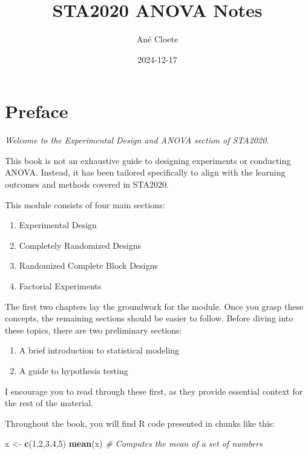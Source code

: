 \documentclass[
  letterpaper,
]{book}
\title{STA2020 ANOVA Notes}
\author{Ané Cloete}
\date{2024-12-17}
\newenvironment{Shaded}{\begin{snugshade}}{\end{snugshade}}
\newcommand{\CommentTok}[1]{\textcolor[rgb]{0.56,0.35,0.01}{\textit{#1}}}
\newcommand{\DecValTok}[1]{\textcolor[rgb]{0.00,0.00,0.81}{#1}}
\newcommand{\FunctionTok}[1]{\textcolor[rgb]{0.13,0.29,0.53}{\textbf{#1}}}
\newcommand{\NormalTok}[1]{#1}
\newcommand{\OtherTok}[1]{\textcolor[rgb]{0.56,0.35,0.01}{#1}}
\providecommand{\tightlist}{%
  \setlength{\itemsep}{0pt}\setlength{\parskip}{0pt}}\usepackage{longtable,booktabs,array}
\renewcommand*\contentsname{Table of contents}
\newcommand\contentsname{Table of contents}
\begin{document}
\frontmatter
\maketitle

\renewcommand*\contentsname{Table of contents}
{
\setcounter{tocdepth}{2}
\tableofcontents
}

\mainmatter
{}

\chapter*{Preface}\label{preface}


\emph{Welcome to the Experimental Design and ANOVA section of STA2020.}

This book is not an exhaustive guide to designing experiments or
conducting ANOVA. Instead, it has been tailored specifically to align
with the learning outcomes and methods covered in STA2020.

This module consists of four main sections:

\begin{enumerate}
\def\labelenumi{\arabic{enumi}.}
\tightlist
\item
  Experimental Design
\item
  Completely Randomized Designs
\item
  Randomized Complete Block Designs
\item
  Factorial Experiments
\end{enumerate}

The first two chapters lay the groundwork for the module. Once you grasp
these concepts, the remaining sections should be easier to follow.
Before diving into these topics, there are two preliminary sections:

\begin{enumerate}
\def\labelenumi{\arabic{enumi}.}
\tightlist
\item
  A brief introduction to statistical modeling
\item
  A guide to hypothesis testing
\end{enumerate}

I encourage you to read through these first, as they provide essential
context for the rest of the material.

Throughout the book, you will find R code presented in chunks like this:

\begin{Shaded}
\begin{Highlighting}[]
\NormalTok{x }\OtherTok{\textless{}{-}} \FunctionTok{c}\NormalTok{(}\DecValTok{1}\NormalTok{,}\DecValTok{2}\NormalTok{,}\DecValTok{3}\NormalTok{,}\DecValTok{4}\NormalTok{,}\DecValTok{5}\NormalTok{)}
\FunctionTok{mean}\NormalTok{(x) }\CommentTok{\# Computes the mean of a set of numbers  }
\end{Highlighting}
\end{Shaded}
\end{document}

